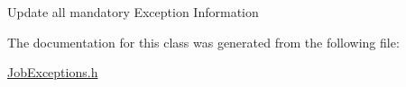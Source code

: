 Update all mandatory Exception Information 

The documentation for this class was generated from the following file:\begin{CompactItemize}
\item 
\hyperlink{JobExceptions_8h}{Job\-Exceptions.h}\end{CompactItemize}
